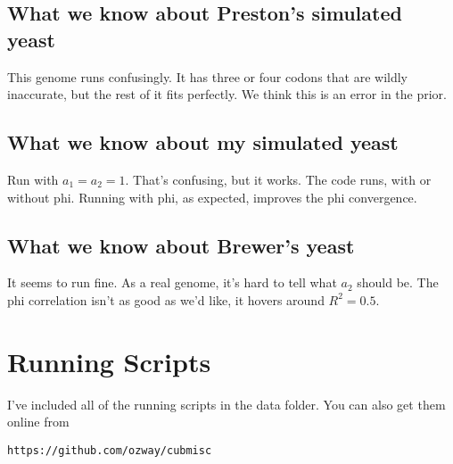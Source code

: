 \subsection{What we know about Preston's simulated yeast}
This genome runs confusingly. It has three or four codons that are wildly inaccurate, but the rest of it fits perfectly. We think this is an error in the prior.

\subsection{What we know about my simulated yeast}
Run with $a_1=a_2=1$. That's confusing, but it works. The code runs, with or without phi. Running with phi, as expected, improves the phi convergence.

\subsection{What we know about Brewer's yeast}

It seems to run fine. As a real genome, it's hard to tell what $a_2$ should be. The phi correlation isn't as good as we'd like, it hovers around $R^2=0.5$.



\section{Running Scripts}

I've included all of the running scripts in the data folder. You can also get them online from

\begin{verbatim}
https://github.com/ozway/cubmisc
\end{verbatim}

